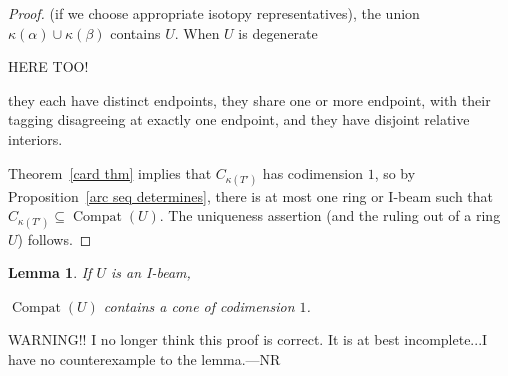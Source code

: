 \documentclass{amsart}
\newtheorem{lemma}[proposition]{Lemma}
\theoremstyle{definition}
\theoremstyle{remark}
\numberwithin{equation}{section}
\newcommand{\0}{{\mathbf{0}}}
\newcommand{\Compat}{\operatorname{Compat}}
\begin{document}
\begin{proof}
(if we choose appropriate isotopy representatives), the union $\kappa(\alpha)\cup\kappa(\beta)$ contains $U$. 
When $U$ is degenerate 


HERE TOO!




 they each have distinct endpoints, they share one or more endpoint, with their tagging disagreeing at exactly one endpoint, and they have disjoint relative interiors.



Theorem~\ref{card thm} implies that $C_{\kappa(T')}$ has codimension $1$, so by Proposition~\ref{arc seq determines}, there is at most one ring or I-beam such that $C_{\kappa(T')}\subseteq\Compat(U)$.
The uniqueness assertion (and the ruling out of a ring $U$) follows.
\end{proof}




\begin{lemma}\label{I-beam codim lemma}
If $U$ is an I-beam, 

$\Compat(U)$ contains a cone of codimension $1$.
\end{lemma}


WARNING!!  I no longer think this proof is correct.
It is at best incomplete...I have no counterexample to the lemma.---NR
\end{document}
